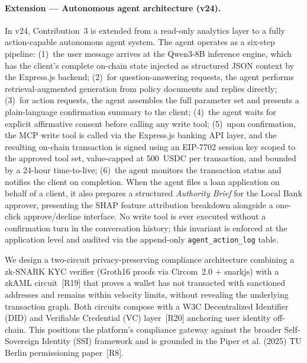 \documentclass[12pt,a4paper]{report}
\begin{document}
\begin{description}[leftmargin=0pt]
\paragraph{Extension --- Autonomous agent architecture (v24).}
In v24, Contribution~3 is extended from a read-only analytics layer to a fully action-capable autonomous agent system. The agent operates as a six-step pipeline: (1)~the user message arrives at the Qwen3-8B inference engine, which has the client's complete on-chain state injected as structured JSON context by the Express.js backend; (2)~for question-answering requests, the agent performs retrieval-augmented generation from policy documents and replies directly; (3)~for action requests, the agent assembles the full parameter set and presents a plain-language confirmation summary to the client; (4)~the agent waits for explicit affirmative consent before calling any write tool; (5)~upon confirmation, the MCP write tool is called via the Express.js banking API layer, and the resulting on-chain transaction is signed using an EIP-7702 session key scoped to the approved tool set, value-capped at 500~USDC per transaction, and bounded by a 24-hour time-to-live; (6)~the agent monitors the transaction status and notifies the client on completion. When the agent files a loan application on behalf of a client, it also prepares a structured \textit{Authority Brief} for the Local Bank approver, presenting the SHAP feature attribution breakdown alongside a one-click approve/decline interface. No write tool is ever executed without a confirmation turn in the conversation history; this invariant is enforced at the application level and audited via the append-only \texttt{agent\_action\_log} table.

\item[\textbf{Contribution 4 --- Compliance-Aware ZKP / zkAML Identity Pathway.}]
We design a two-circuit privacy-preserving compliance architecture combining a zk-SNARK KYC verifier (Groth16 proofs via Circom~2.0 + snarkjs) with a zkAML circuit~[R19] that proves a wallet has not transacted with sanctioned addresses and remains within velocity limits, without revealing the underlying transaction graph. Both circuits compose with a W3C Decentralized Identifier (DID) and Verifiable Credential (VC) layer~[R20] anchoring user identity off-chain. This positions the platform's compliance gateway against the broader Self-Sovereign Identity (SSI) framework and is grounded in the Piper et al. (2025) TU Berlin permissioning paper~[R8].


\end{description}
\end{document}
